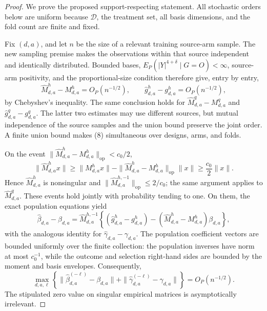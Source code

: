 \documentclass{article}
\begin{document}
\begin{proof}
We prove the proposed support-respecting statement.  All stochastic orders below are uniform because \(\mathcal D\), the treatment set, all basis dimensions, and the fold count are finite and fixed.

Fix \((d,a)\), and let \(n\) be the size of a relevant training source-arm sample.  The new sampling premise makes the observations within that source independent and identically distributed.  Bounded bases, \(E_P(|Y|^{4+\delta}\mid G=O)<\infty\), source-arm positivity, and the proportional-size condition therefore give, entry by entry,
\[
 \widehat M^h_{d,a}-M^h_{d,a}=O_P(n^{-1/2}),
 \qquad
 \widehat g^h_{d,a}-g^h_{d,a}=O_P(n^{-1/2}),                 \tag{8}
\]
by Chebyshev's inequality.  The same conclusion holds for \(\widehat M^q_{d,a}-M^q_{d,a}\) and \(\widehat g^q_{d,a}-g^q_{d,a}\).  The latter two estimates may use different sources, but mutual independence of the source samples and the union bound preserve the joint order.  A finite union bound makes (8) simultaneous over designs, arms, and folds.

On the event \(\|\widehat M^h_{d,a}-M^h_{d,a}\|_{\mathrm{op}}<c_0/2\),
\[
 \|\widehat M^h_{d,a}x\|
 \ge \|M^h_{d,a}x\|
      -\|\widehat M^h_{d,a}-M^h_{d,a}\|_{\mathrm{op}}\|x\|
 \ge \frac{c_0}{2}\|x\|.                                  \tag{9}
\]
Hence \(\widehat M^h_{d,a}\) is nonsingular and \(\|\widehat M^{h,-1}_{d,a}\|_{\mathrm{op}}\le2/c_0\); the same argument applies to \(\widehat M^q_{d,a}\).  These events hold jointly with probability tending to one.  On them, the exact population equations yield
\[
 \widehat\beta_{d,a}-\beta_{d,a}
 =\widehat M_{d,a}^{h,-1}
 \left\{(\widehat g^h_{d,a}-g^h_{d,a})
 -(\widehat M^h_{d,a}-M^h_{d,a})\beta_{d,a}\right\},       \tag{10}
\]
with the analogous identity for \(\widehat\gamma_{d,a}-\gamma_{d,a}\).  The population coefficient vectors are bounded uniformly over the finite collection: the population inverses have norm at most \(c_0^{-1}\), while the outcome and selection right-hand sides are bounded by the moment and basis envelopes.  Consequently,
\[
 \max_{d,a,\ell}\left\{
 \|\widehat\beta_{d,a}^{(-\ell)}-\beta_{d,a}\|
 +\|\widehat\gamma_{d,a}^{(-\ell)}-\gamma_{d,a}\|
 \right\}=O_P(n^{-1/2}).                                    \tag{11}
\]
The stipulated zero value on singular empirical matrices is asymptotically irrelevant.


\end{proof}
\end{document}
